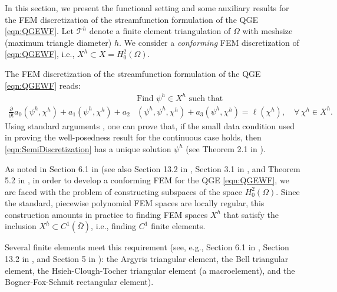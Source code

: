In this section, we present the functional setting and some auxiliary results
for the FEM discretization of the streamfunction formulation of the QGE
\eqref{eqn:QGEWF}. Let $\mathcal{T}^h$ denote a finite element triangulation of
$\Omega$ with meshsize (maximum triangle diameter) $h$. We consider a
\emph{conforming} FEM discretization of \eqref{eqn:QGEWF}, i.e., $X^h \subset X
= H_0^2(\Omega)$.

The FEM discretization of the streamfunction formulation of the QGE
\eqref{eqn:QGEWF} reads:
\begin{equation}
  \begin{split}
    &\text{Find } \psi^h \in X^h \text{ such that} \\
    \frac{\partial}{\partial t} a_0(\psi^h,\chi^h) + a_1(\psi^h,\chi^h) + a_2&(\psi^h,\psi^h,\chi^h)
      + a_3(\psi^h,\chi^h) = \ell(\chi^h),\quad \forall \, \chi^h \in X^h.
    \label{eqn:SemiDiscretization}
  \end{split}
\end{equation}
Using standard arguments \cite{Girault79,Girault86}, one can prove that, if the
small data condition used in proving the well-posedness result for the
continuous case holds, then \eqref{eqn:SemiDiscretization} has a unique solution
$\psi^h$ (see Theorem 2.1 in \cite{Cayco86}).

As noted in Section 6.1 in \cite{Ciarlet} (see also Section 13.2 in
\cite{Gunzburger89}, Section 3.1 in \cite{Johnson}, and Theorem 5.2 in
\cite{Braess}, in order to develop a conforming FEM for the QGE
\eqref{eqn:QGEWF}, we are faced with the problem of constructing subspaces of
the space $H^2_0(\Omega)$. Since the standard, piecewise polynomial FEM spaces
are locally regular, this construction amounts in practice to finding FEM spaces
$X^h$ that satisfy the inclusion $X^h \subset C^1({\bar \Omega})$, i.e., finding
$C^1$ finite elements.

Several finite elements meet this requirement (see, e.g., Section 6.1 in
\cite{Ciarlet}, Section 13.2 in \cite{Gunzburger89}, and Section 5 in
\cite{Braess}): the Argyris triangular element, the Bell triangular element, the
Hsieh-Clough-Tocher triangular element (a macroelement), and the
Bogner-Fox-Schmit rectangular element).

